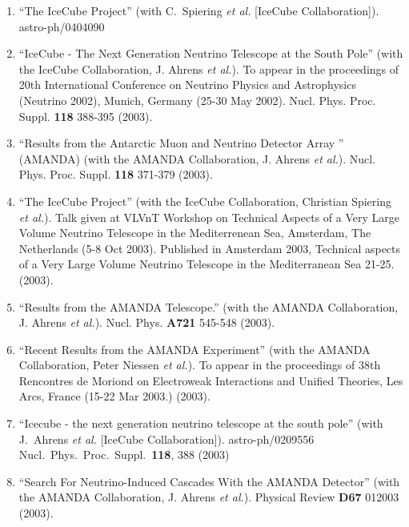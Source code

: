 \begin{enumerate}
\item ``The IceCube Project'' (with C.~Spiering {\it et al.}
        [IceCube   Collaboration]).  \\{}astro-ph/0404090

\item ``IceCube - The Next Generation Neutrino Telescope at
        the South   Pole'' (with the IceCube Collaboration,
        J. Ahrens {\it et al.}).  To appear   in the
        proceedings of 20th International Conference on
        Neutrino   Physics and Astrophysics (Neutrino 2002),
        Munich, Germany (25-30 May   2002).  Nucl. Phys.
        Proc. Suppl. {\bf 118} 388-395 (2003).

\item ``Results from the Antarctic Muon and Neutrino
        Detector Array  '' (AMANDA) (with the AMANDA
        Collaboration, J. Ahrens {\it et al.}).   Nucl.
        Phys. Proc. Suppl. {\bf 118} 371-379 (2003). ~ \item
        ``The IceCube Project'' (with the IceCube
        Collaboration, Christian   Spiering {\it et al.}).
        Talk given at VLVnT Workshop on Technical Aspects
        of a Very Large Volume Neutrino Telescope in the
        Mediterrenean Sea,   Amsterdam, The Netherlands (5-8
        Oct 2003). Published in Amsterdam   2003, Technical
        aspects of a Very Large Volume Neutrino Telescope in
        the Mediterranean Sea 21-25. (2003).

\item ``Results from the AMANDA Telescope.'' (with the
        AMANDA   Collaboration, J. Ahrens {\it et al.}).
        Nucl. Phys. {\bf A721} 545-548   (2003).

\item ``Recent Results from the AMANDA Experiment'' (with
        the AMANDA   Collaboration, Peter Niessen {\it et
        al.}).  To appear in the proceedings   of 38th
        Rencontres de Moriond on Electroweak Interactions
        and   Unified Theories, Les Arcs, France (15-22 Mar
        2003.) (2003).

\item ``Icecube - the next generation neutrino telescope at
        the south pole'' (with J.~Ahrens {\it et al.}
        [IceCube Collaboration]). astro-ph/0209556
        \\{}Nucl.\ Phys.\ Proc.\ Suppl.\  {\bf 118}, 388
        (2003) %

\item ``Search For Neutrino-Induced Cascades With the AMANDA
        Detector''   (with the AMANDA Collaboration, J.
        Ahrens {\it et al.}).  Physical Review {\bf   D67}
        012003 (2003).


\end{enumerate}
